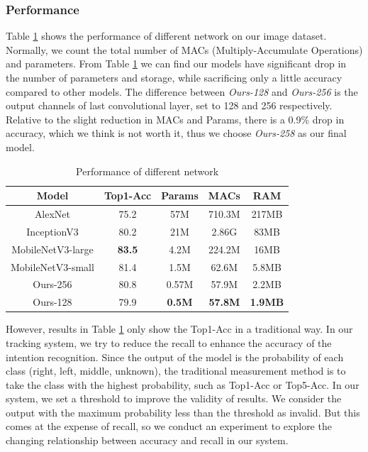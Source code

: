 \documentclass[journal]{IEEEtran}
\begin{document}
\subsubsection{Performance}
Table \ref{tab:performance} shows the performance of different network on our image dataset. Normally, we count the total number of MACs (Multiply-Accumulate Operations) and parameters. From Table \ref{tab:performance} we can find our models have significant drop in the number of parameters and storage, while sacrificing only a little accuracy compared to other models. The difference between \textit{Ours-128} and \textit{Ours-256} is the output channels of last convolutional layer, set to 128 and 256 respectively. Relative to the slight reduction in MACs and Params, there is a 0.9\% drop in accuracy, which we think is not worth it, thus we choose \textit{Ours-258} as our final model.
\begin{table}[htbp]
    \centering
    \caption{Performance of different network}
      \begin{tabular}{c|c|cc|c}
      \toprule[2pt]
      Model & {Top1-Acc} & {Params} & {MACs} & {RAM} \\
      \midrule
      AlexNet & 75.2  & 57M   & 710.3M & 217MB \\
      InceptionV3 & 80.2  & 21M   & 2.86G & 83MB \\
      MobileNetV3-large & \textbf{83.5} & 4.2M  & 224.2M & 16MB \\
    MobileNetV3-small & \textcolor[rgb]{ .267,  .447,  .769}{81.4} & 1.5M  & 62.6M & 5.8MB \\
      \midrule
    Ours-256 & 80.8  & \textcolor[rgb]{ .267,  .447,  .769}{0.57M} & \textcolor[rgb]{ .267,  .447,  .769}{57.9M} & \textcolor[rgb]{ .267,  .447,  .769}{2.2MB} \\
      Ours-128 & 79.9  & \textbf{0.5M} & \textbf{57.8M} & \textbf{1.9MB} \\
      \bottomrule[2pt]
      \end{tabular}%
    \label{tab:performance}%
  \end{table}%

However, results in Table \ref{tab:performance} only show the Top1-Acc in a traditional way. In our tracking system, we try to reduce the recall to enhance the accuracy of the intention recognition. 
Since the output of the model is the probability of each class (right, left, middle, unknown), the traditional measurement method is to take the class with the highest probability, such as Top1-Acc or Top5-Acc. 
In our system, we set a threshold to improve the validity of results. We consider the output with the maximum probability less than the threshold as invalid.
But this comes at the expense of recall, so we conduct an experiment to explore the changing relationship between accuracy and recall in our system.
\end{document}

